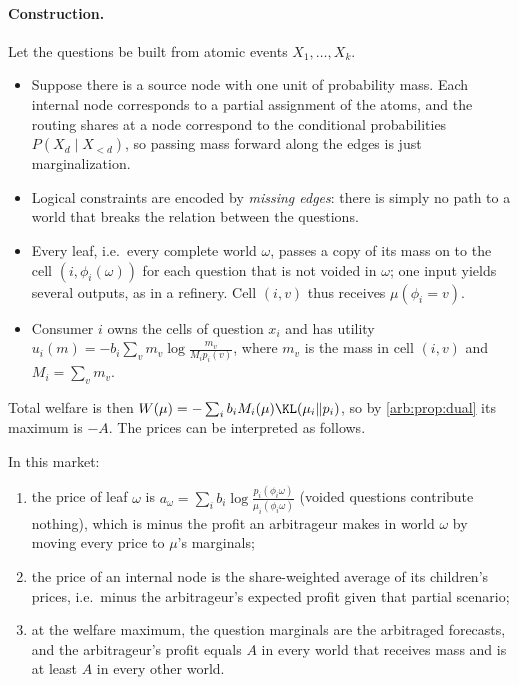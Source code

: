 \begin{draftblock}
\paragraph{Construction.} Let the questions be built from atomic events $X_1,\dots,X_k$.
\begin{itemize}
\item Suppose there is a source node with one unit of probability mass. Each internal node corresponds to a partial assignment of the atoms, and the routing shares at a node correspond to the conditional probabilities $P(X_d\mid X_{<d})$, so passing mass forward along the edges is just marginalization.
\item Logical constraints are encoded by \emph{missing edges}: there is simply no path to a world that breaks the relation between the questions.
\item Every leaf, i.e.\ every complete world $\omega$, passes a copy of its mass on to the cell $(i,\phi_i(\omega))$ for each question that is not voided in $\omega$; one input yields several outputs, as in a refinery. Cell $(i,v)$ thus receives $\mu(\phi_i=v)$.
\item Consumer $i$ owns the cells of question $x_i$ and has utility $u_i(m)=-b_i\sum_vm_v\log\frac{m_v}{M_ip_i(v)}$, where $m_v$ is the mass in cell $(i,v)$ and $M_i=\sum_vm_v$.
\end{itemize}
Total welfare is then $W(\mu)=-\sum_ib_iM_i(\mu)\KL(\mu_i\|p_i)$, so by \cref{arb:prop:dual} its maximum is $-A$. The prices can be interpreted as follows.

\begin{theorem}\label{arb:thm:deep}
In this market:
\begin{enumerate}
\item the price of leaf $\omega$ is $a_\omega=\sum_ib_i\log\frac{p_i(\phi_i\omega)}{\mu_i(\phi_i\omega)}$ (voided questions contribute nothing), which is minus the profit an arbitrageur makes in world $\omega$ by moving every price to $\mu$'s marginals;
\item the price of an internal node is the share-weighted average of its children's prices, i.e.\ minus the arbitrageur's expected profit given that partial scenario;
\item at the welfare maximum, the question marginals are the arbitraged forecasts, and the arbitrageur's profit equals $A$ in every world that receives mass and is at least $A$ in every other world.
\end{enumerate}
\end{theorem}


\end{draftblock}
